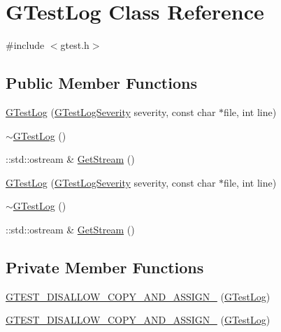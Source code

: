 \hypertarget{classtesting_1_1internal_1_1GTestLog}{\section{\-G\-Test\-Log \-Class \-Reference}
\label{da/d59/classtesting_1_1internal_1_1GTestLog}
}


{\ttfamily \#include $<$gtest.\-h$>$}

\subsection*{\-Public \-Member \-Functions}
\begin{DoxyCompactItemize}
\item 
\hyperlink{classtesting_1_1internal_1_1GTestLog_a42659176d108d5be556dc5b2d7052cbd}{\-G\-Test\-Log} (\hyperlink{namespacetesting_1_1internal_ae0fec1ef790bf38b60329e0ca9538e9a}{\-G\-Test\-Log\-Severity} severity, const char $\ast$file, int line)
\item 
\hyperlink{classtesting_1_1internal_1_1GTestLog_a940c2f4f55e8acf2c5dd52a75f828186}{$\sim$\-G\-Test\-Log} ()
\item 
\-::std\-::ostream \& \hyperlink{classtesting_1_1internal_1_1GTestLog_a7f92cb631b3e86fed035acac6a11a929}{\-Get\-Stream} ()
\item 
\hyperlink{classtesting_1_1internal_1_1GTestLog_a42659176d108d5be556dc5b2d7052cbd}{\-G\-Test\-Log} (\hyperlink{namespacetesting_1_1internal_ae0fec1ef790bf38b60329e0ca9538e9a}{\-G\-Test\-Log\-Severity} severity, const char $\ast$file, int line)
\item 
\hyperlink{classtesting_1_1internal_1_1GTestLog_a940c2f4f55e8acf2c5dd52a75f828186}{$\sim$\-G\-Test\-Log} ()
\item 
\-::std\-::ostream \& \hyperlink{classtesting_1_1internal_1_1GTestLog_a7f92cb631b3e86fed035acac6a11a929}{\-Get\-Stream} ()
\end{DoxyCompactItemize}
\subsection*{\-Private \-Member \-Functions}
\begin{DoxyCompactItemize}
\item 
\hyperlink{classtesting_1_1internal_1_1GTestLog_ab634134d3562ed5846deef1a12b00425}{\-G\-T\-E\-S\-T\-\_\-\-D\-I\-S\-A\-L\-L\-O\-W\-\_\-\-C\-O\-P\-Y\-\_\-\-A\-N\-D\-\_\-\-A\-S\-S\-I\-G\-N\-\_\-} (\hyperlink{classtesting_1_1internal_1_1GTestLog}{\-G\-Test\-Log})
\item 
\hyperlink{classtesting_1_1internal_1_1GTestLog_ab634134d3562ed5846deef1a12b00425}{\-G\-T\-E\-S\-T\-\_\-\-D\-I\-S\-A\-L\-L\-O\-W\-\_\-\-C\-O\-P\-Y\-\_\-\-A\-N\-D\-\_\-\-A\-S\-S\-I\-G\-N\-\_\-} (\hyperlink{classtesting_1_1internal_1_1GTestLog}{\-G\-Test\-Log})
\end{DoxyCompactItemize}
